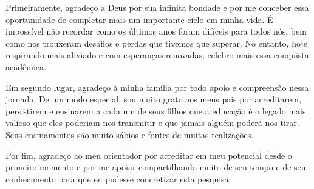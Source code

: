 \begin{agradecimentos}
    Primeiramente, agradeço a Deus por sua infinita bondade e por me conceber essa oportunidade de completar mais um importante ciclo em minha vida.
    É impossível não recordar como os últimos anos foram difíceis para todos nós, bem como nos trouxeram desafios e perdas que tivemos que superar. 
    No entanto, hoje respirando mais aliviado e com esperanças renovadas, celebro mais essa conquista acadêmica.
    
    Em segundo lugar, agradeço à minha família por todo apoio e compreensão nessa jornada. De um modo especial, sou muito grato aos meus pais por acreditarem, persistirem e ensinarem a cada um de seus filhos que a educação é o legado mais valioso que eles poderiam nos transmitir e que jamais alguém poderá nos tirar.
    Seus ensinamentos são muito sábios e fontes de muitas realizações.

    Por fim, agradeço ao meu orientador por acreditar em meu potencial desde o primeiro momento e por me apoiar compartilhando muito de seu tempo e de seu conhecimento para que eu pudesse concretizar esta pesquisa.
\end{agradecimentos}